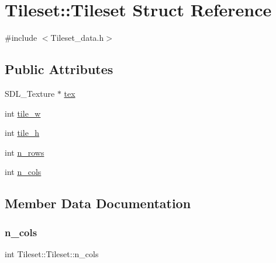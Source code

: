 \hypertarget{struct_tileset_1_1_tileset}{}\section{Tileset\+:\+:Tileset Struct Reference}
\label{struct_tileset_1_1_tileset}


{\ttfamily \#include $<$Tileset\+\_\+data.\+h$>$}

\subsection*{Public Attributes}
\begin{DoxyCompactItemize}
\item 
S\+D\+L\+\_\+\+Texture $\ast$ \mbox{\hyperlink{struct_tileset_1_1_tileset_ab02a257f75080be18b2a75b4c19a18d2}{tex}}
\item 
int \mbox{\hyperlink{struct_tileset_1_1_tileset_a25dc2c11c7d5c5f5f546ef49bd15c502}{tile\+\_\+w}}
\item 
int \mbox{\hyperlink{struct_tileset_1_1_tileset_a893e65a572ff3d13192358cf2d50b4f4}{tile\+\_\+h}}
\item 
int \mbox{\hyperlink{struct_tileset_1_1_tileset_a9289eb2077afd3433c0c07c2f36db2b2}{n\+\_\+rows}}
\item 
int \mbox{\hyperlink{struct_tileset_1_1_tileset_a819b8a308ebc8e544f1225195101e35c}{n\+\_\+cols}}
\end{DoxyCompactItemize}


\subsection{Member Data Documentation}
\mbox{\label{struct_tileset_1_1_tileset_a819b8a308ebc8e544f1225195101e35c}} 
\subsubsection{\texorpdfstring{n\+\_\+cols}{n\_cols}}
{\footnotesize\ttfamily int Tileset\+::\+Tileset\+::n\+\_\+cols}

\mbox{\label{struct_tileset_1_1_tileset_a9289eb2077afd3433c0c07c2f36db2b2}} 
